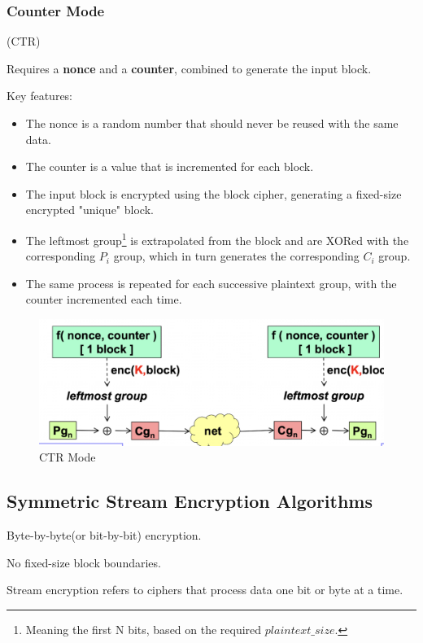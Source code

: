 \clearpage 
\subsubsection{Counter Mode}
\begin{center}
    (CTR)
\end{center}
Requires a \textbf{nonce} and a \textbf{counter}, combined to generate the input block.

Key features:
\begin{itemize}
    \item The nonce is a random number that should never be reused with the same data.
    \item The counter is a value that is incremented for each block.
    \item The input block is encrypted using the block cipher, generating a fixed-size encrypted "unique" block.
    \item The leftmost group\footnote{Meaning the first N bits, based on the required $plaintext\_size$.} is extrapolated from the block and are XORed with the corresponding $P_i$ group, which in turn generates the corresponding $C_i$ group.
    \item The same process is repeated for each successive plaintext group, with the counter incremented each time.
\end{itemize}

\begin{figure}[H]
    \centering
    \includegraphics[width=0.6\linewidth]{Images/Cryptography/CTR_ENC.png}
    \caption{CTR Mode}
\end{figure}


\subsection{Symmetric Stream Encryption Algorithms}
\begin{center}
    Byte-by-byte(or bit-by-bit) encryption.

    No fixed-size block boundaries.
\end{center}
Stream encryption refers to ciphers that process data one bit or byte at a time.





